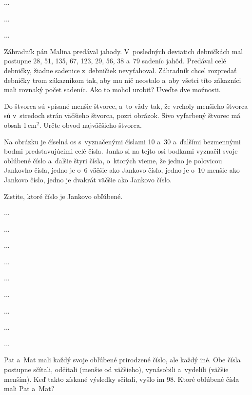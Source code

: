 {%
...}

{%
...}

{%
...}

{%
Záhradník pán Malina predával jahody.
V~posledných deviatich debničkách mal postupne 28, 51, 135, 67, 123, 29, 56, 38 a~79 sadeníc jahôd.
Predával celé debničky, žiadne sadenice z~debničiek nevyťahoval.
Záhradník chcel rozpredať debničky trom zákazníkom tak, aby mu nič neostalo a~aby všetci títo zákazníci mali rovnaký počet sadeníc.
Ako to mohol urobiť?
Uveďte dve možnosti.
}

{%
Do štvorca sú vpísané menšie štvorce, a~to vždy tak, že vrcholy menšieho štvorca sú v~stredoch strán väčšieho štvorca, pozri obrázok.
Sivo vyfarbený štvorec má obsah 1\,cm$^2$.
Určte obvod najväčšieho štvorca.
\ifobrazkyvedla\else{}\fi%
}

{%
Na obrázku je číselná os s~vyznačenými číslami 10 a~30 a~ďalšími bezmennými bodmi predstavujúcimi celé čísla.
Janko si na tejto osi bodkami vyznačil svoje obľúbené číslo a~ďalšie štyri čísla, o~ktorých vieme, že
\itemitem{$\bullet$} jedno je polovicou Jankovho čísla,
\itemitem{$\bullet$} jedno je o~6 väčšie ako Jankovo číslo,
\itemitem{$\bullet$} jedno je o~10 menšie ako Jankovo číslo,
\itemitem{$\bullet$} jedno je dvakrát väčšie ako Jankovo číslo.

Zistite, ktoré číslo je Jankovo obľúbené.
{}%
}

{%
...}

{%
...}

{%
...}

{%
...}

{%
...}

{%
...}

{%
...}

{%
...}

{%
...}

{%
Pat a~Mat mali každý svoje obľúbené prirodzené číslo, ale každý iné.
Obe čísla postupne sčítali, odčítali (menšie od väčšieho), vynásobili a~vydelili (väčšie menším).
Keď takto získané výsledky sčítali, vyšlo im 98.
Ktoré obľúbené čísla mali Pat a~Mat?
}

